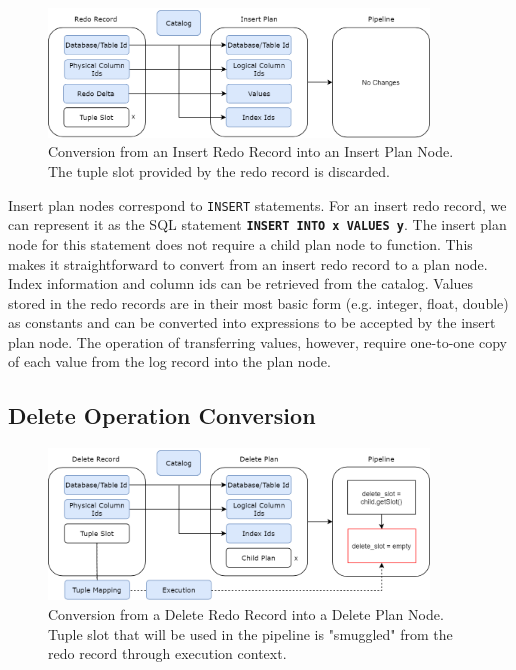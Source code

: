 \documentclass[12pt]{cmuthesis}
\newcommand{\dbSQL}[1]{\texttt{\textbf{#1}}\xspace}
\begin{document}
\begin{figure}[H]
\centering
\includegraphics[width=0.9\textwidth]{images/InsertConversion.png}
\caption{Conversion from an Insert Redo Record into an Insert Plan Node. The tuple slot provided by the redo record is discarded.}
\label{fig:insert_conversion}
\end{figure}
Insert plan nodes correspond to \texttt{INSERT} statements. For an insert redo record, we can represent it as the SQL statement \dbSQL{INSERT INTO x VALUES y}. The insert plan node for this statement does not require a child plan node to function. This makes it straightforward to convert from an insert redo record to a plan node. Index information and column ids can be retrieved from the catalog. Values stored in the redo records are in their most basic form (e.g. integer, float, double) as constants and can be converted into expressions to be accepted by the insert plan node. The operation of transferring values, however, require one-to-one copy of each value from the log record into the plan node. 

\subsection{Delete Operation Conversion}
\begin{figure}[H]
\centering
\includegraphics[width=0.9\textwidth]{images/DeleteConversion.png}
\caption{Conversion from a Delete Redo Record into a Delete Plan Node. Tuple slot that will be used in the pipeline is "smuggled" from the redo record through execution context.}
\label{fig:delete_conversion}
\end{figure}
\end{document}

